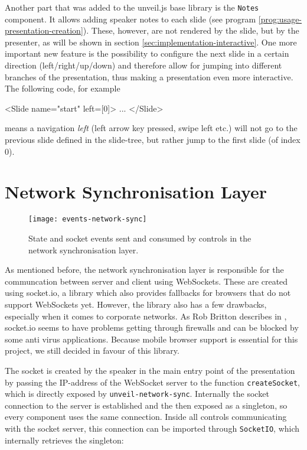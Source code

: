 Another part that was added to the unveil.js base library is the \texttt{Notes} component. It allows adding speaker notes to each slide (see program \ref{prog:usage-presentation-creation}). These, however, are not rendered by the slide, but by the presenter, as will be shown in section \ref{sec:implementation-interactive}. One more important new feature is the possibility to configure the next slide in a certain direction (left/right/up/down) and therefore allow for jumping into different branches of the presentation, thus making a presentation even more interactive. The following code, for example
%
\begin{JsCode}
  <Slide name="start" left={[0]}>
    ...
  </Slide>
\end{JsCode}
%
means a navigation \emph{left} (left arrow key pressed, swipe left etc.) will not go to the previous slide defined in the slide-tree, but rather jump to the first slide (of index $0$).

\section{Network Synchronisation Layer}
\label{sec:implementation-network-sync}

\begin{figure}
\centering
\texttt{[image: events-network-sync]}
\caption{State and socket events sent and consumed by controls in the network synchronisation layer.}
\label{fig:implementation-events-network-sync}
\end{figure}


As mentioned before, the network synchronisation layer is responsible for the communcation between server and client using WebSockets. These are created using socket.io, a library which also provides fallbacks for browsers that do not support WebSockets yet. However, the library also has a few drawbacks, especially when it comes to corporate networks. As Rob Britton describes in \cite{socketio-problems}, socket.io seems to have problems getting through firewalls and can be blocked by some anti virus applications.
Because mobile browser support is essential for this project, we still decided in favour of this library.

The socket is created by the speaker in the main entry point of the presentation by passing the IP-address of the WebSocket server to the function \texttt{createSocket}, which is directly exposed by \texttt{unveil-network-sync}. Internally the socket connection to the server is established and the then exposed as a singleton, so every component uses the same connection. Inside all controls communicating with the socket server, this connection can be imported through \texttt{SocketIO}, which internally retrieves the singleton:

